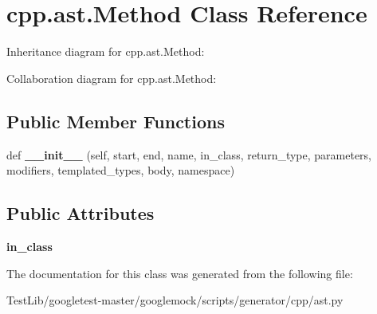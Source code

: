 \hypertarget{classcpp_1_1ast_1_1Method}{}\section{cpp.\+ast.\+Method Class Reference}
\label{classcpp_1_1ast_1_1Method}


Inheritance diagram for cpp.\+ast.\+Method\+:


Collaboration diagram for cpp.\+ast.\+Method\+:
\subsection*{Public Member Functions}
\begin{DoxyCompactItemize}
\item 
\mbox{\label{classcpp_1_1ast_1_1Method_aa3cbdc9c4b7e92b15fa6acea0dbf2322}} 
def {\bfseries \+\_\+\+\_\+init\+\_\+\+\_\+} (self, start, end, name, in\+\_\+class, return\+\_\+type, parameters, modifiers, templated\+\_\+types, body, namespace)
\end{DoxyCompactItemize}
\subsection*{Public Attributes}
\begin{DoxyCompactItemize}
\item 
\mbox{\label{classcpp_1_1ast_1_1Method_aa67244c3673afed43398b5d3e3fa6c1c}} 
{\bfseries in\+\_\+class}
\end{DoxyCompactItemize}


The documentation for this class was generated from the following file\+:\begin{DoxyCompactItemize}
\item 
Test\+Lib/googletest-\/master/googlemock/scripts/generator/cpp/ast.\+py\end{DoxyCompactItemize}
